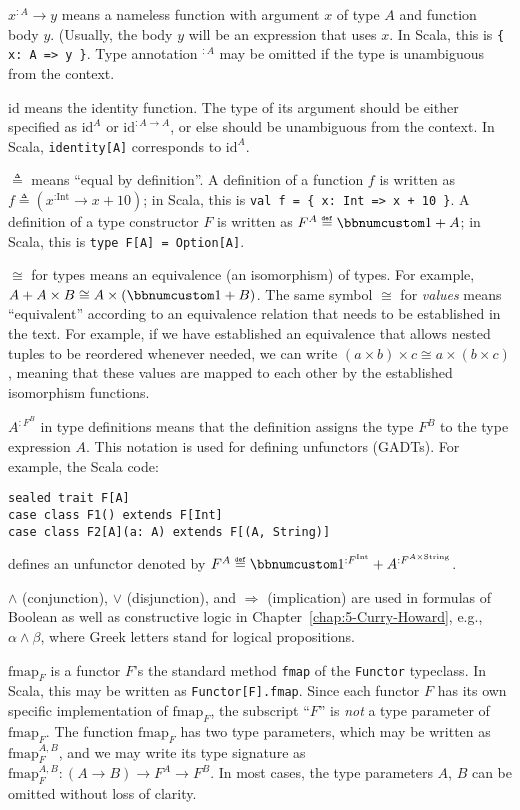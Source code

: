 $x^{:A}\rightarrow y$ means a nameless function with argument $x$
of type $A$ and function body $y$. (Usually, the body $y$ will
be an expression that uses $x$. In Scala, this is \lstinline!{ x: A => y }!.
Type annotation $^{:A}$ may be omitted if the type is unambiguous
from the context.

$\text{id}$ means the identity function. The type of its argument
should be either specified as $\text{id}^{A}$ or $\text{id}^{:A\rightarrow A}$,
or else should be unambiguous from the context. In Scala,  \lstinline!identity[A]!
corresponds to $\text{id}^{A}$.

$\triangleq$ means \textsf{``}equal by definition\textsf{''}. A definition of a function
$f$ is written as $f\triangleq(x^{:\text{Int}}\rightarrow x+10)$;
in Scala, this is \lstinline!val f = { x: Int => x + 10 }!. A definition
of a type constructor $F$ is written as $F^{A}\triangleq\bbnum 1+A$;
in Scala, this is \lstinline!type F[A] = Option[A]!.

$\cong$ for types means an equivalence (an isomorphism) of types.
For example, $A+A\times B\cong A\times\left(\bbnum 1+B\right)$. The
same symbol $\cong$ for \emph{values} means \textsf{``}equivalent\textsf{''} according
to an equivalence relation that needs to be established in the text.
For example, if we have established an equivalence that allows nested
tuples to be reordered whenever needed, we can write $\left(a\times b\right)\times c\cong a\times\left(b\times c\right)$,
meaning that these values are mapped to each other by the established
isomorphism functions. 

$A^{:F^{B}}$ in type definitions means that the definition assigns
the type $F^{B}$ to the type expression $A$. This notation is used
for defining unfunctors (GADTs). For example, the Scala code:

\begin{lstlisting}
sealed trait F[A]
case class F1() extends F[Int]
case class F2[A](a: A) extends F[(A, String)]
\end{lstlisting}
defines an unfunctor denoted by $F^{A}\triangleq\bbnum 1^{:F^{\text{Int}}}+A^{:F^{A\times\text{String}}}$.

$\wedge$ (conjunction), $\vee$ (disjunction), and $\Rightarrow$
(implication) are used in formulas of Boolean as well as constructive
logic in Chapter~\ref{chap:5-Curry-Howard}, e.g., $\alpha\wedge\beta$,
where Greek letters stand for logical propositions.

$\text{fmap}_{F}$ is a functor $F$\textsf{'}s the standard method \lstinline!fmap!
of the \lstinline!Functor! typeclass. In Scala, this may be written
as \texttt{}\lstinline!Functor[F].fmap!. Since each functor $F$
has its own specific implementation of $\text{fmap}_{F}$, the subscript
\textsf{``}$F$\textsf{''} is \emph{not} a type parameter of $\text{fmap}_{F}$. The
function $\text{fmap}_{F}$ has two type parameters, which may be
written as $\text{fmap}_{F}^{A,B}$, and we may write its type signature
as $\text{fmap}_{F}^{A,B}:\left(A\rightarrow B\right)\rightarrow F^{A}\rightarrow F^{B}$.
In most cases, the type parameters $A$, $B$ can be omitted without
loss of clarity.

